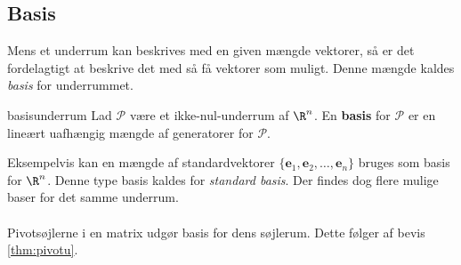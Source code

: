 \subsection{Basis}
Mens et underrum kan beskrives med en given mængde vektorer, så er det fordelagtigt at beskrive det med så få vektorer som muligt. 
Denne mængde kaldes \textit{basis} for underrummet.
%
\begin{defn}{}{basisunderrum}
Lad $\mathcal{P}$ være et ikke-nul-underrum af $\R^n$. 
En \textbf{basis} for $\mathcal{P}$ er en lineært uafhængig mængde af generatorer for $\mathcal{P}$.
\end{defn}
\noindent
Eksempelvis kan en mængde af standardvektorer $\{\textbf{e}_1,\textbf{e}_2,\ldots,\textbf{e}_n\}$ bruges som basis for $\R^n$.
Denne type basis kaldes for \textit{standard basis}.
Der findes dog flere mulige baser for det samme underrum.
\\\\
%
Pivotsøjlerne i en matrix udgør basis for dens søjlerum. Dette følger af bevis \ref{thm:pivotu}.
\\\\
